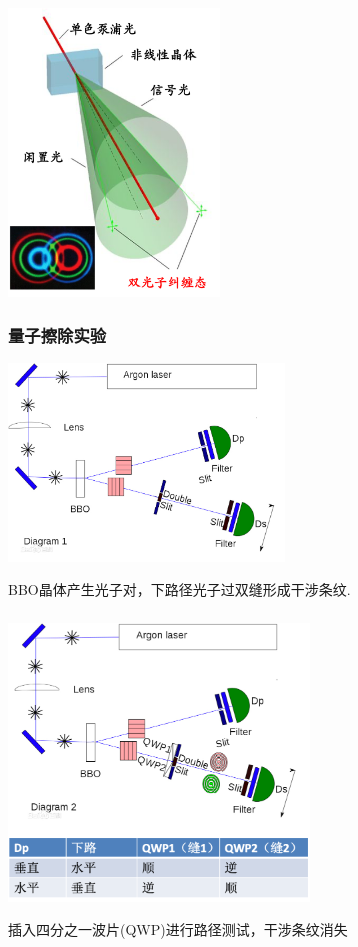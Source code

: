 \begin{frame}
    \frametitle{}
    \begin{center}
        \includegraphics[width=0.42\textwidth]{figs/32.png}
    \end{center}
\end{frame}

\begin{frame}
    \frametitle{量子擦除实验}
    \begin{center}
        \includegraphics[width=0.55\textwidth]{figs/c1.png}
    \end{center}
    BBO晶体产生光子对，下路径光子过双缝形成干涉条纹.
\end{frame} 

\begin{frame}
    \frametitle{}
    \begin{center}
        \includegraphics[width=0.6\textwidth]{figs/c2.png}
    \end{center}
    插入四分之一波片(QWP)进行路径测试，干涉条纹消失
\end{frame} 

